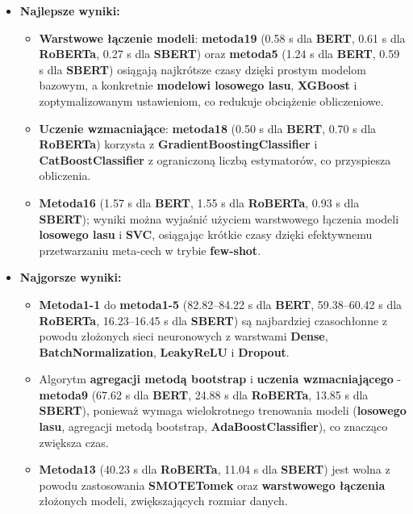 \begin{itemize}
	\item \textbf{Najlepsze wyniki:}
	      \begin{itemize}
		      \item \textbf{Warstwowe łączenie modeli}: \textbf{metoda19} (0.58 s dla \textbf{BERT}, 0.61 s dla \textbf{RoBERTa}, 0.27 s dla \textbf{SBERT}) oraz \textbf{metoda5} (1.24 s dla \textbf{BERT}, 0.59 s dla \textbf{SBERT}) osiągają najkrótsze czasy dzięki prostym modelom bazowym, a konkretnie \textbf{modelowi losowego lasu}, \textbf{XGBoost} i zoptymalizowanym ustawieniom, co redukuje obciążenie obliczeniowe.
		      \item \textbf{Uczenie wzmacniające}: \textbf{metoda18} (0.50 s dla \textbf{BERT}, 0.70 s dla \textbf{RoBERTa}) korzysta z \textbf{GradientBoostingClassifier} i \textbf{CatBoostClassifier} z ograniczoną liczbą estymatorów, co przyspiesza obliczenia.
		      \item \textbf{Metoda16} (1.57 s dla \textbf{BERT}, 1.55 s dla \textbf{RoBERTa}, 0.93 s dla \textbf{SBERT}); wyniki można wyjaśnić użyciem warstwowego łączenia modeli \textbf{losowego lasu} i \textbf{SVC}, osiągając krótkie czasy dzięki efektywnemu przetwarzaniu meta-cech w trybie \textbf{few-shot}.
	      \end{itemize}
	\item \textbf{Najgorsze wyniki:}
	      \begin{itemize}
		      \item \textbf{Metoda1-1} do \textbf{metoda1-5} (82.82--84.22 s dla \textbf{BERT}, 59.38--60.42 s dla \textbf{RoBERTa}, 16.23--16.45 s dla \textbf{SBERT}) są najbardziej czasochłonne z powodu złożonych sieci neuronowych z warstwami \textbf{Dense}, \textbf{BatchNormalization}, \textbf{LeakyReLU} i \textbf{Dropout}.
		      \item Algorytm \textbf{agregacji metodą bootstrap} i \textbf{uczenia wzmacniającego} - \textbf{metoda9} (67.62 s dla \textbf{BERT}, 24.88 s dla \textbf{RoBERTa}, 13.85 s dla \textbf{SBERT}), ponieważ wymaga wielokrotnego trenowania modeli (\textbf{losowego lasu}, agregacji metodą bootstrap, \textbf{AdaBoostClassifier}), co znacząco zwiększa czas.
		      \item \textbf{Metoda13} (40.23 s dla \textbf{RoBERTa}, 11.04 s dla \textbf{SBERT}) jest wolna z powodu zastosowania \textbf{SMOTETomek} oraz \textbf{warstwowego łączenia} złożonych modeli, zwiększających rozmiar danych.
	      \end{itemize}
\end{itemize}

